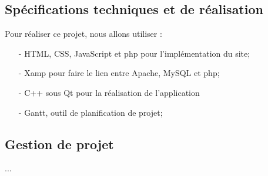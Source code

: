 \documentclass[a4paper]{article}
\begin{document}
	\subsection{Spécifications techniques et de réalisation}
	Pour réaliser ce projet, nous allons utiliser :
	\begin{itemize}
		\item[-] HTML, CSS, JavaScript et php pour l'implémentation du site;
		\item[-] Xamp pour faire le lien entre Apache, MySQL et php;
		\item[-] C++ sous Qt pour la réalisation de l'application
		\item[-] Gantt, outil de planification de projet;
	\end{itemize}

	\subsection{Gestion de projet}
	...
	
	\newpage
	\appendix
	\listoffigures
		
\end{document}
